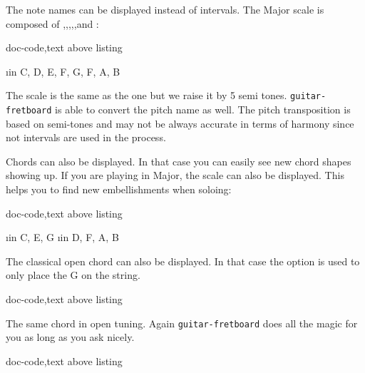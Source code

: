 \documentclass[a4paper]{article}
\newcommand{\pkg}[1]{\texttt{#1}}
\begin{document}
The note names can be displayed instead of intervals. The \pF Major scale is
composed of \pF,\pG,\pA,\pBb,\pC,\pD and \pE:

\begin{tcblisting}{doc-code,text above listing}
  \begin{fb}[frets before = 2, frets after = 2,
      transpose = 5,
      transpose pitch,
      legend text = {F Major scale (\pF, \pG, \pA, \pBb, \pC, \pD, \pE)},
      fret numbers visible]
    \foreach \i in { C, D, E, F, G, F, A, B} {
      \note[lower]{\i}
    }
  \end{fb}
\end{tcblisting}

The \pF scale is the same as the \pC one but we raise it by 5 semi
tones. \pkg{guitar-fretboard} is able to convert the pitch name as well. The
pitch transposition is based on semi-tones and may not be always accurate in
terms of harmony since not intervals are used in the process.

Chords can also be displayed. In that case you can easily see new \pC chord
shapes showing up. If you are playing in \pC Major, the scale can also be
displayed. This helps you to find new embellishments when soloing:

\begin{tcblisting}{doc-code,text above listing}
  \begin{fb}[frets before = 2, frets after = 2,
      legend text = {C Chord (and C major scale)},
      fret numbers visible]
    \foreach \i in {C, E, G} {
      \note{\i}
    }
    \foreach \i in {D, F, A, B} {
      \note[shade]{\i}
    }
  \end{fb}
\end{tcblisting}

The classical \pC open chord can also be displayed. In that case the
 option is used to only place the G on the  string.

\begin{tcblisting}{doc-code,text above listing}
  \begin{fb}[frets min = 0, frets max = 3,
      legend text = {\pC Chord},
      fret numbers visible]
      
  \end{fb}
\end{tcblisting}

The same chord in open \pG{} tuning. Again \pkg{guitar-fretboard} does all
the magic for you as long as you ask nicely.

\begin{tcblisting}{doc-code,text above listing}
  \begin{fb}[frets min = 0, frets max = 3,
      tuning={2,7,2,7,11,2},
      legend text = {\pC Chord in open \pG tuning},
      fret numbers visible]
      
  \end{fb}
\end{tcblisting}
\end{document}
